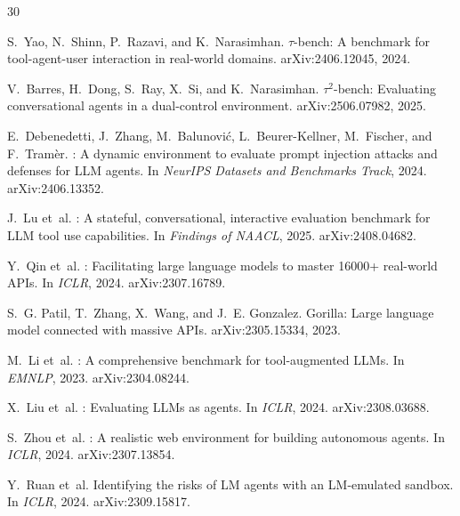 ﻿\documentclass[11pt]{article}
\begin{document}
\begin{thebibliography}{30}
\small

S.~Yao, N.~Shinn, P.~Razavi, and K.~Narasimhan.
\newblock $\tau$-bench: A benchmark for tool-agent-user interaction in
  real-world domains.
\newblock arXiv:2406.12045, 2024.

V.~Barres, H.~Dong, S.~Ray, X.~Si, and K.~Narasimhan.
\newblock $\tau^2$-bench: Evaluating conversational agents in a dual-control
  environment.
\newblock arXiv:2506.07982, 2025.

E.~Debenedetti, J.~Zhang, M.~Balunovi\'{c}, L.~Beurer-Kellner, M.~Fischer, and
  F.~Tram\`{e}r.
: A dynamic environment to evaluate prompt injection
  attacks and defenses for {LLM} agents.
\newblock In \emph{NeurIPS Datasets and Benchmarks Track}, 2024.
\newblock arXiv:2406.13352.

J.~Lu et~al.
: A stateful, conversational, interactive evaluation
  benchmark for {LLM} tool use capabilities.
\newblock In \emph{Findings of NAACL}, 2025.
\newblock arXiv:2408.04682.

Y.~Qin et~al.
: Facilitating large language models to master 16000+
  real-world {API}s.
\newblock In \emph{ICLR}, 2024.
\newblock arXiv:2307.16789.

S.~G. Patil, T.~Zhang, X.~Wang, and J.~E. Gonzalez.
\newblock Gorilla: Large language model connected with massive {API}s.
\newblock arXiv:2305.15334, 2023.

M.~Li et~al.
: A comprehensive benchmark for tool-augmented {LLM}s.
\newblock In \emph{EMNLP}, 2023.
\newblock arXiv:2304.08244.

X.~Liu et~al.
: Evaluating {LLM}s as agents.
\newblock In \emph{ICLR}, 2024.
\newblock arXiv:2308.03688.

S.~Zhou et~al.
: A realistic web environment for building autonomous
  agents.
\newblock In \emph{ICLR}, 2024.
\newblock arXiv:2307.13854.

Y.~Ruan et~al.
\newblock Identifying the risks of {LM} agents with an {LM}-emulated sandbox.
\newblock In \emph{ICLR}, 2024.
\newblock arXiv:2309.15817.


\end{thebibliography}
\end{document}
